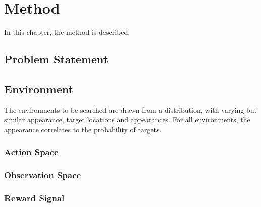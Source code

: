 \chapter{Method}
\label{cha:method}

In this chapter, the method is described.

\section{Problem Statement}




\section{Environment}

The environments to be searched are drawn from a distribution, with varying but similar appearance, target locations and appearances. For all environments, the appearance correlates to the probability of targets.

\subsection{Action Space}

\subsection{Observation Space}


\subsection{Reward Signal}


